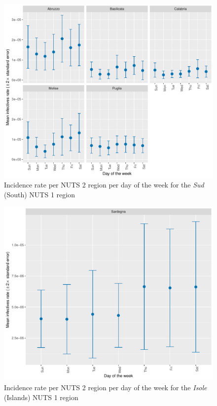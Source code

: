 \documentclass[12pt]{article}
\begin{document}
\begin{appendices}
    	\begin{figure}[H]
    	    \centering
    	    \includegraphics[width=\textwidth]{output/infective_rates_weekday_Sud.pdf}
    	    \caption{Incidence rate per NUTS 2 region per day of the week for the \textit{Sud} (South) NUTS 1 region}
    	    \label{fig:incidence_sud_weekday}
    	\end{figure}
		
		\begin{figure}[H]
    	    \centering
    	    \includegraphics[width=\textwidth]{output/infective_rates_weekday_Isole.pdf}
    	    \caption{Incidence rate per NUTS 2 region per day of the week for the \textit{Isole} (Islands) NUTS 1 region}
    	    \label{fig:incidence_isole_weekday}
    	\end{figure}
		

\end{appendices}
\end{document}
